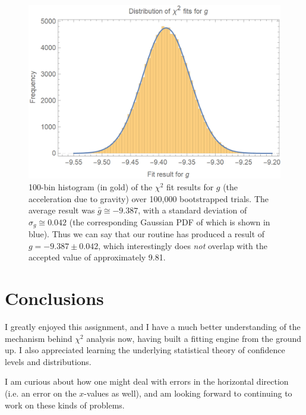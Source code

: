 \documentclass{article}
\begin{document}
\bigskip
{}
\medskip

\begin{figure}[H]
    \centering
    \includegraphics[width=4.5in]{homework7/g_hist.png}
    \caption{100-bin histogram (in gold) of the $\chi^2$ fit results for $g$ (the acceleration due to gravity) over 100,000 bootstrapped trials. The average result was $\bar{g}\cong-9.387$, with a standard deviation of $\sigma_g\cong0.042$ (the corresponding Gaussian PDF of which is shown in blue). Thus we can say that our routine has produced a result of $g=-9.387\pm0.042$, which interestingly does \emph{not} overlap with the accepted value of approximately 9.81.}
    \label{fig:g}
\end{figure}

\bigskip
{}
\medskip


\section{Conclusions}

I greatly enjoyed this assignment, and I have a much better understanding of the mechanism behind $\chi^2$ analysis now, having built a fitting engine from the ground up. I also appreciated learning the underlying statistical theory of confidence levels and distributions.

I am curious about how one might deal with errors in the horizontal direction (i.e. an error on the $x$-values as well), and am looking forward to continuing to work on these kinds of problems.
\end{document}
